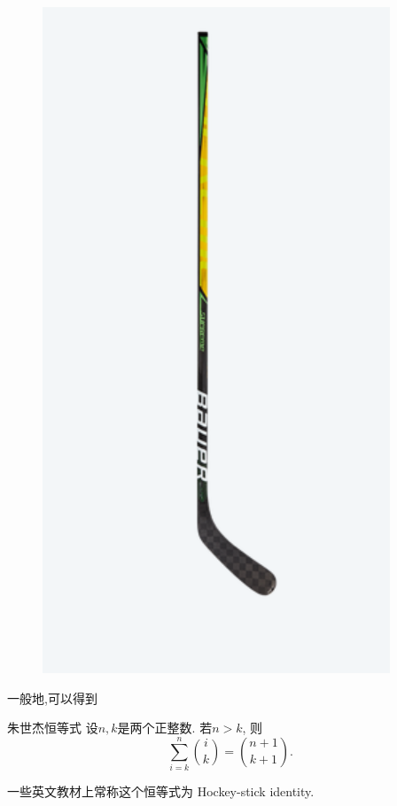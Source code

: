 \documentclass[10pt,punct]{ctexbeamer}
\begin{document}
\begin{frame}
\begin{minipage}{0.3\linewidth}
\begin{figure}
        \includegraphics[scale=0.3]{HockeyStick.png}
    \end{figure}
\end{minipage}

一般地,可以得到
\begin{block}{朱世杰恒等式}
    设$n,k$是两个正整数.
    若$n>k$, 则
    $$\sum_{i=k}^{n}\binom{i}{k}=\binom{n+1}{k+1}.$$
\end{block}

一些英文教材上常称这个恒等式为 Hockey-stick identity.

\end{frame}
\end{document}
